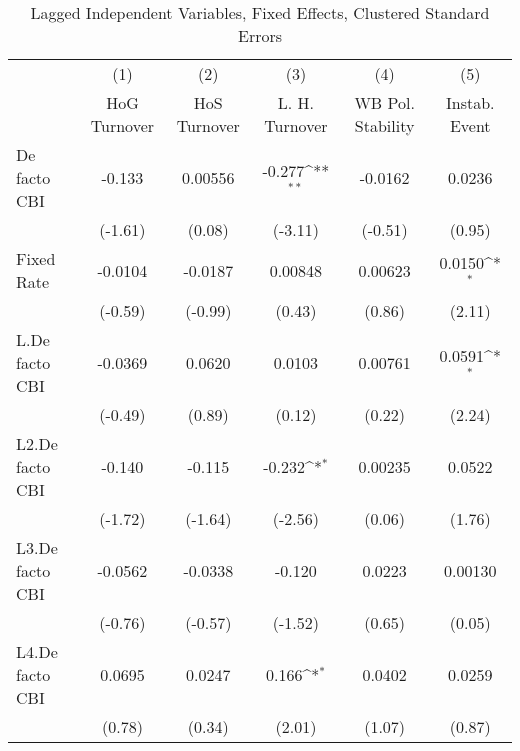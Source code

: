 {
\def\sym#1{\ifmmode^{#1}\else\(^{#1}\)\fi}
\begin{longtable}{l*{5}{c}}
\caption{Lagged Independent Variables, Fixed Effects, Clustered Standard Errors \label{lagsDF}}\\
\hline\hline\endfirsthead\hline\endhead\hline\endfoot\endlastfoot
                &\multicolumn{1}{c}{(1)}&\multicolumn{1}{c}{(2)}&\multicolumn{1}{c}{(3)}&\multicolumn{1}{c}{(4)}&\multicolumn{1}{c}{(5)}\\
                &\multicolumn{1}{c}{HoG Turnover}&\multicolumn{1}{c}{HoS Turnover}&\multicolumn{1}{c}{L. H. Turnover}&\multicolumn{1}{c}{WB Pol. Stability}&\multicolumn{1}{c}{Instab. Event}\\
\hline
De facto CBI    &   -0.133         &  0.00556         &   -0.277\sym{**} &  -0.0162         &   0.0236         \\
                &  (-1.61)         &   (0.08)         &  (-3.11)         &  (-0.51)         &   (0.95)         \\
[1em]
Fixed Rate      &  -0.0104         &  -0.0187         &  0.00848         &  0.00623         &   0.0150\sym{*}  \\
                &  (-0.59)         &  (-0.99)         &   (0.43)         &   (0.86)         &   (2.11)         \\
[1em]
L.De facto CBI  &  -0.0369         &   0.0620         &   0.0103         &  0.00761         &   0.0591\sym{*}  \\
                &  (-0.49)         &   (0.89)         &   (0.12)         &   (0.22)         &   (2.24)         \\
[1em]
L2.De facto CBI &   -0.140         &   -0.115         &   -0.232\sym{*}  &  0.00235         &   0.0522         \\
                &  (-1.72)         &  (-1.64)         &  (-2.56)         &   (0.06)         &   (1.76)         \\
[1em]
L3.De facto CBI &  -0.0562         &  -0.0338         &   -0.120         &   0.0223         &  0.00130         \\
                &  (-0.76)         &  (-0.57)         &  (-1.52)         &   (0.65)         &   (0.05)         \\
[1em]
L4.De facto CBI &   0.0695         &   0.0247         &    0.166\sym{*}  &   0.0402         &   0.0259         \\
                &   (0.78)         &   (0.34)         &   (2.01)         &   (1.07)         &   (0.87)         \\

\end{longtable}}

